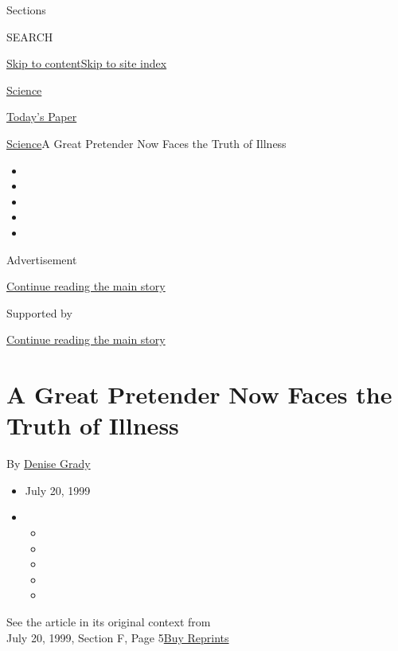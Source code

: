 Sections

SEARCH

\protect\hyperlink{site-content}{Skip to
content}\protect\hyperlink{site-index}{Skip to site index}

\href{https://www.nytimes3xbfgragh.onion/section/science}{Science}

\href{https://myaccount.nytimes3xbfgragh.onion/auth/login?response_type=cookie\&client_id=vi}{}

\href{https://www.nytimes3xbfgragh.onion/section/todayspaper}{Today's
Paper}

\href{/section/science}{Science}\textbar{}A Great Pretender Now Faces
the Truth of Illness

\begin{itemize}
\item
\item
\item
\item
\item
\end{itemize}

Advertisement

\protect\hyperlink{after-top}{Continue reading the main story}

Supported by

\protect\hyperlink{after-sponsor}{Continue reading the main story}

\hypertarget{a-great-pretender-now-faces-the-truth-of-illness}{%
\section{A Great Pretender Now Faces the Truth of
Illness}\label{a-great-pretender-now-faces-the-truth-of-illness}}

By \href{https://www.nytimes3xbfgragh.onion/by/denise-grady}{Denise
Grady}

\begin{itemize}
\item
  July 20, 1999
\item
  \begin{itemize}
  \item
  \item
  \item
  \item
  \item
  \end{itemize}
\end{itemize}

See the article in its original context from\\
July 20, 1999, Section F, Page
5\href{https://store.nytimes3xbfgragh.onion/collections/new-york-times-page-reprints?utm_source=nytimes\&utm_medium=article-page\&utm_campaign=reprints}{Buy
Reprints}

